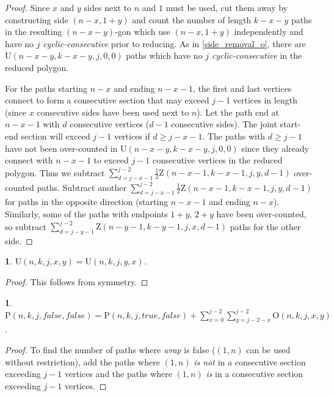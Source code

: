 \documentclass[a4paper, 12pt] {article}
\theoremstyle{remark}
\theoremstyle{plain}
\newcommand{\thistheoremname}{}
\newtheorem{genericthm}[theorem]{\thistheoremname}
\newenvironment{namedthm}[1]
  {\renewcommand{\thistheoremname}{#1}
   \begin{genericthm}}
  {\end{genericthm}}
\theoremstyle{remark}
\begin{document}
\begin{proof}
Since $x$ and $y$ sides next to $n$ and $1$ must be used, cut them away by constructing side $(n-x,1+y)$ and count the number of length $k-x-y$ paths in the resulting $(n-x-y)$-gon which use $(n-x,1+y)$ independently and have no $j$ \textit{cyclic-consecutive} prior to reducing. As in \ref{side_removal_o}, there are $\mathrm{U}(n-x-y,k-x-y,j,0,0)$ paths which have no $j$ \textit{cyclic-consecutive} in the reduced polygon.

For the paths starting $n-x$ and ending $n-x-1$, the first and last vertices connect to form a consecutive section that may exceed $j-1$ vertices in length (since $x$ consecutive sides have been used next to $n$).
Let the path end at $n-x-1$ with $d$ consecutive vertices ($d-1$ consecutive sides). The joint start-end section will exceed $j-1$ vertices if $d \geq j-x-1$. The paths with $d \geq j-1$ have not been over-counted in $\mathrm{U}(n-x-y,k-x-y,j,0,0)$ since they already connect with $n-x-1$ to exceed $j-1$ consecutive vertices in the reduced polygon.
Thus we subtract $\sum_{d=j-x-1}^{j-2} \frac{1}{2}\mathrm{Z}(n-x-1,k-x-1,j,y,d-1)$ over-counted paths.
Subtract another $\sum_{d=j-x-1}^{j-2} \frac{1}{2}\mathrm{Z}(n-x-1,k-x-1,j,y,d-1)$ for paths in the opposite direction (starting $n-x-1$ and ending $n-x$).
Similarly, some of the paths with endpoints $1+y$, $2+y$ have been over-counted, so subtract $\sum_{d=j-y-1}^{j-2} \mathrm{Z}(n-y-1,k-y-1,j,x,d-1)$ paths for the other side.
\end{proof}


\begin{namedthm}{Symmetry Theorem U}
\label{symmetry_u}
$\mathrm{U}(n,k,j,x,y)=\mathrm{U}(n,k,j,y,x)$.
\end{namedthm}

\begin{proof}
This follows from symmetry.
\end{proof}


\begin{namedthm}{Restricted Consecutivity Theorem}
\label{restricted_consecutivity}
$\mathrm{P}(n,k,j,false,false)=\mathrm{P}(n,\allowbreak k,j,true,false)+\sum_{x=0}^{j-2} \sum_{y=j-2-x}^{j-2} \mathrm{O}(n,k,j,x,y)$.
\end{namedthm}

\begin{proof}
To find the number of paths where \textit{wrap} is false ($(1,n)$ can be used without restriction), add the paths where $(1,n)$ \emph{is not} in a consecutive section exceeding $j-1$ vertices and the paths where $(1,n)$ \emph{is} in a consecutive section exceeding $j-1$ vertices.
\end{proof}
\end{document}
